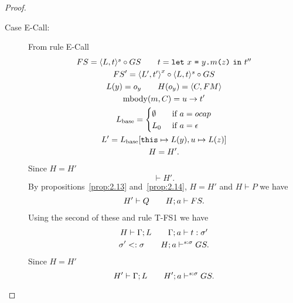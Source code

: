 \begin{proof}
\begin{description}
\begin{description}
        \item[Case {\sc E-Call}:] From rule {\sc E-Call}
          \begin{equation} \label{eq:ecall1}
            \begin{gathered}
              FS = \mbox{$\langle L, t \rangle^s$} \circ GS \quad\quad t = \mbox{\mdseries\texttt{let}~$x$~\texttt{=}~$\mbox{\mdseries$y$\texttt{.}$m$\texttt{(}$z$\texttt{)}}$~\texttt{in}~$t''$}\\
              FS' = \mbox{$\langle L', t' \rangle$}^x \circ \mbox{$\langle L, t \rangle^s$} \circ GS \\
              L(y) = o_y \quad\quad H(o_y) = \mbox{$\langle C, FM \rangle$} \\
              \mbox{$\mathrm{mbody}$}(m, C) = u \to t' \\
              L_{\text{base}} =
              \begin{cases}
                \emptyset & \text{ if } a = \mbox{$ocap$} \\
                L_0       & \text{ if } a = \mbox{$\epsilon$}
              \end{cases} \\
              L' = L_{\text{base}}[\mbox{\mdseries\texttt{this}} \mapsto L(y), u \mapsto L(z)] \\
              H = H'.
            \end{gathered}
          \end{equation}
          Since $H = H'$ 
          \begin{equation*}
            \vdash H'.
          \end{equation*}
          By propositions~\ref{prop:2.13} and~\ref{prop:2.14}, $H = H'$ and
          $H \vdash P$ we have
          \begin{equation}
            \begin{gathered}
              H' \vdash Q \quad\quad H;a \vdash FS.
            \end{gathered}
          \end{equation}
          Using the second of these and rule {\sc T-FS1} we have
          \begin{equation} \label{eq:ecall-hp0}
            \begin{gathered}
              H \vdash \Gamma; L \quad\quad \mbox{$\Gamma;a\vdash t:\sigma'$} \\
              \sigma' <: \sigma \quad\quad H; a \vdash^{s:\sigma} GS.
            \end{gathered}
          \end{equation}
          Since $H = H'$
          \begin{equation} \label{eq:ecall-hp5}
            H' \vdash \Gamma;L \andalso H'; a \vdash^{s: \sigma} GS.

\end{equation}
\end{description}
\end{description}
\end{proof}
